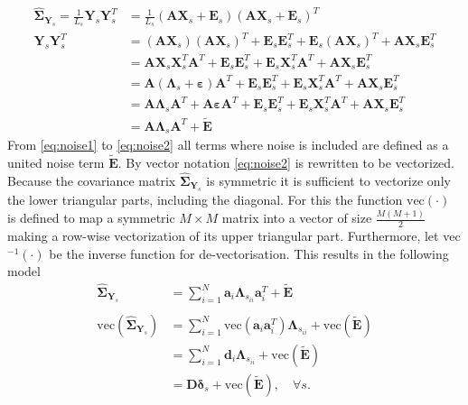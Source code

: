 \begin{align} 
\widehat{\boldsymbol{\Sigma}}_{\mathbf{Y}_s} = \frac{1}{L_s}\mathbf{Y}_s \mathbf{Y}_s^T &= \frac{1}{L_s} \left( \mathbf{A} \mathbf{X}_s + \mathbf{E}_s \right) \left( \mathbf{A} \mathbf{X}_s + \mathbf{E}_s\right)^T \nonumber \\ 
\mathbf{Y}_s \mathbf{Y}_s^T &= (\textbf{AX}_s)(\textbf{AX}_s)^T + \textbf{E}_s \textbf{E}_s^T + \textbf{E}_s (\textbf{AX}_s)^T + \textbf{AX}_s \textbf{E}_s^T \nonumber \\
&= \textbf{AX}_s \textbf{X}_s^T \textbf{A}^T + \textbf{E}_s \textbf{E}_s^T + \textbf{E}_s \textbf{X}_s^T \textbf{A}^T + \textbf{AX}_s \textbf{E}_s^T \nonumber \\
&= \textbf{A}(\boldsymbol{\Lambda}_s +\boldsymbol{\varepsilon}) \textbf{A}^T + \textbf{E}_s \textbf{E}_s^T + \textbf{E}_s \textbf{X}_s^T \textbf{A}^T + \textbf{AX}_s \textbf{E}_s^T \nonumber \\
&= \textbf{A} \boldsymbol{\Lambda}_s \textbf{A}^T + \textbf{A} \boldsymbol{\varepsilon} \textbf{A}^T + \textbf{E}_s \textbf{E}_s^T + \textbf{E}_s \textbf{X}_s^T \textbf{A}^T + \textbf{AX}_s \textbf{E}_s^T \label{eq:noise1} \\
&= \textbf{A} \boldsymbol{\Lambda}_s \textbf{A}^T + \widetilde{\textbf{E}} \label{eq:noise2}
\end{align}
From \eqref{eq:noise1} to \eqref{eq:noise2} all terms where noise is included are defined as a united noise term $\widetilde{\textbf{E}}$. 
By vector notation \eqref{eq:noise2} is rewritten to be vectorized. 
Because the covariance matrix $\widehat{\boldsymbol{\Sigma}}_{\mathbf{Y}_s}$ is symmetric it is sufficient to vectorize only the lower triangular parts, including the diagonal. 
For this the function $\text{vec}(\cdot)$ is defined to map a symmetric $M \times M$ matrix into a vector of size $\frac{M(M+1)}{2}$ making a row-wise vectorization of its upper triangular part. 
Furthermore, let vec$^{-1}(\cdot)$ be the inverse function for de-vectorisation. 
This results in the following model        
\begin{align}
\widehat{\boldsymbol{\Sigma}}_{\mathbf{Y}_s} &= \sum_{i=1}^{N}  \textbf{a}_i \boldsymbol{\Lambda}_{s_{ii}} \textbf{a}_i^{T} + \widetilde{\textbf{E}} \nonumber \\
& \nonumber \\
\text{vec}(\widehat{\boldsymbol{\Sigma}}_{\mathbf{Y}_s}) &= \sum_{i=1}^N \text{vec}(\mathbf{a}_i \mathbf{a}_i^T) \boldsymbol{\Lambda}_{s_{ii}} + \text{vec}( \widetilde{\textbf{E}}) \nonumber \\
&= \sum_{i=1}^N \mathbf{d}_i \boldsymbol{\Lambda}_{s_{ii}} + \text{vec}( \widetilde{\textbf{E}}) \nonumber \nonumber \\
&= \mathbf{D} \boldsymbol{\delta}_s + \text{vec}( \widetilde{\textbf{E}}), \quad \forall s. \label{eq:cov1}
\end{align}
